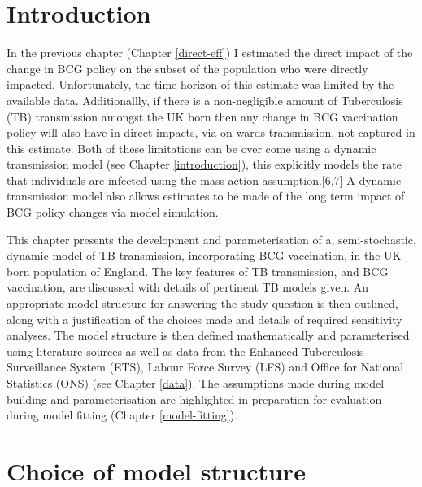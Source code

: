 \documentclass[11pt,twoside]{bristolthesis}
\begin{document}
  \hypertarget{introduction-6}{%
  \section{Introduction}\label{introduction-6}}
  
  In the previous chapter (Chapter \ref{direct-eff}) I estimated the direct impact of the change in BCG policy on the subset of the population who were directly impacted. Unfortunately, the time horizon of this estimate was limited by the available data. Additionallly, if there is a non-negligible amount of Tuberculosis (TB) transmission amongst the UK born then any change in BCG vaccination policy will also have in-direct impacts, via on-wards transmission, not captured in this estimate. Both of these limitations can be over come using a dynamic transmission model (see Chapter \ref{introduction}), this explicitly models the rate that individuals are infected using the mass action assumption.{[}6,7{]} A dynamic transmission model also allows estimates to be made of the long term impact of BCG policy changes via model simulation.
  
  This chapter presents the development and parameterisation of a, semi-stochastic, dynamic model of TB transmission, incorporating BCG vaccination, in the UK born population of England. The key features of TB transmission, and BCG vaccination, are discussed with details of pertinent TB models given. An appropriate model structure for answering the study question is then outlined, along with a justification of the choices made and details of required sensitivity analyses. The model structure is then defined mathematically and parameterised using literature sources as well as data from the Enhanced Tuberculosis Surveillance System (ETS), Labour Force Survey (LFS) and Office for National Statistics (ONS) (see Chapter \ref{data}). The assumptions made during model building and parameterisation are highlighted in preparation for evaluation during model fitting (Chapter \ref{model-fitting}).
  
  \hypertarget{model-just}{%
  \section{Choice of model structure}\label{model-just}}
  
\end{document}
